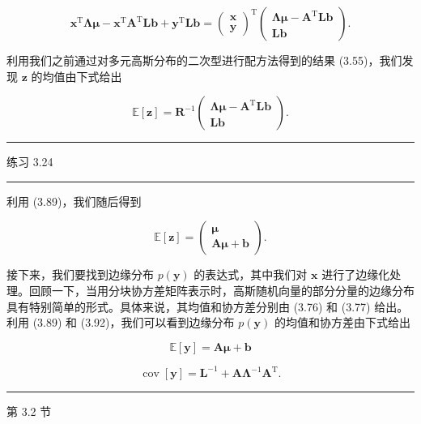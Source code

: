\documentclass[10pt]{report}
\newcommand{\HRule}{\begin{center}\rule{0.9\linewidth}{0.2mm}\end{center}}
\begin{document}
\[
{\mathbf{x}}^{\mathrm{T}}\mathbf{\Lambda }\mathbf{\mu } - {\mathbf{x}}^{\mathrm{T}}{\mathbf{A}}^{\mathrm{T}}\mathbf{L}\mathbf{b} + {\mathbf{y}}^{\mathrm{T}}\mathbf{L}\mathbf{b} = {\left( \begin{array}{l} \mathbf{x} \\  \mathbf{y} \end{array}\right) }^{\mathrm{T}}\left( \begin{matrix} \mathbf{\Lambda }\mathbf{\mu } - {\mathbf{A}}^{\mathrm{T}}\mathbf{L}\mathbf{b} \\  \mathbf{L}\mathbf{b} \end{matrix}\right) . \tag{3.90}
\]

利用我们之前通过对多元高斯分布的二次型进行配方法得到的结果 (3.55)，我们发现 \(\mathbf{z}\) 的均值由下式给出

\[
\mathbb{E}\left\lbrack  \mathbf{z}\right\rbrack   = {\mathbf{R}}^{-1}\left( \begin{matrix} \mathbf{\Lambda }\mathbf{\mu } - {\mathbf{A}}^{\mathrm{T}}\mathbf{L}\mathbf{b} \\  \mathbf{L}\mathbf{b} \end{matrix}\right) . \tag{3.91}
\]

\HRule

练习 3.24

\HRule

利用 (3.89)，我们随后得到

\[
\mathbb{E}\left\lbrack  \mathbf{z}\right\rbrack   = \left( \begin{matrix} \mathbf{\mu } \\  \mathbf{A}\mathbf{\mu } + \mathbf{b} \end{matrix}\right) . \tag{3.92}
\]

接下来，我们要找到边缘分布 \(p\left( \mathbf{y}\right)\) 的表达式，其中我们对 \(\mathbf{x}\) 进行了边缘化处理。回顾一下，当用分块协方差矩阵表示时，高斯随机向量的部分分量的边缘分布具有特别简单的形式。具体来说，其均值和协方差分别由 (3.76) 和 (3.77) 给出。利用 (3.89) 和 (3.92)，我们可以看到边缘分布 \(p\left( \mathbf{y}\right)\) 的均值和协方差由下式给出

\[
\mathbb{E}\left\lbrack  \mathbf{y}\right\rbrack   = \mathbf{A}\mathbf{\mu } + \mathbf{b} \tag{3.93}
\]

\[
\operatorname{cov}\left\lbrack  \mathbf{y}\right\rbrack   = {\mathbf{L}}^{-1} + \mathbf{A}{\mathbf{\Lambda }}^{-1}{\mathbf{A}}^{\mathrm{T}}. \tag{3.94}
\]

\HRule

第 3.2 节
\end{document}
